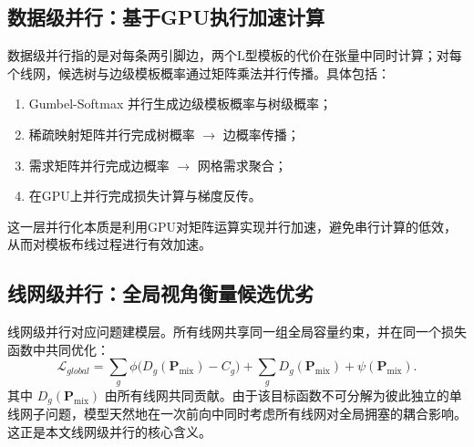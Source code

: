\subsection{数据级并行：基于GPU执行加速计算}

数据级并行指的是对每条两引脚边，两个L型模板的代价在张量中同时计算；对每个线网，候选树与边级模板概率通过矩阵乘法并行传播。具体包括：
\begin{enumerate}
    \item Gumbel-Softmax 并行生成边级模板概率与树级概率；
    \item 稀疏映射矩阵并行完成树概率 $\rightarrow$ 边概率传播；
    \item 需求矩阵并行完成边概率 $\rightarrow$ 网格需求聚合；
    \item 在GPU上并行完成损失计算与梯度反传。
\end{enumerate}

这一层并行化本质是利用GPU对矩阵运算实现并行加速，避免串行计算的低效，从而对模板布线过程进行有效加速。

\subsection{线网级并行：全局视角衡量候选优劣}

线网级并行对应问题建模层。所有线网共享同一组全局容量约束，并在同一个损失函数中共同优化：
\begin{equation}
    \mathcal{L}_{global}=\sum_{g}\phi\big(D_g(\mathbf{P}_{\mathrm{mix}})-C_g\big)+\sum_g D_g(\mathbf{P}_{\mathrm{mix}})+\psi(\mathbf{P}_{\mathrm{mix}}).
\end{equation}
其中 $D_g(\mathbf{P}_{\mathrm{mix}})$ 由所有线网共同贡献。由于该目标函数不可分解为彼此独立的单线网子问题，模型天然地在一次前向中同时考虑所有线网对全局拥塞的耦合影响。这正是本文线网级并行的核心含义。



